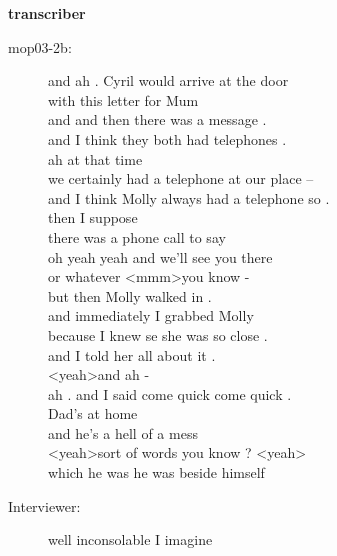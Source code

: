 \documentclass{article}
\newcommand{\turn}[2]{
\item[#1:] #2
}
\begin{document}
\begin{center}\textbf{transcriber}\end{center}

\begin{description}

\turn{mop03-2b}{and ah . Cyril would arrive at the door\\
with this letter for Mum\\
and and then there was a message .\\
and I think they both had telephones .\\
ah at that time\\
we certainly had a telephone at our place --\\
and I think Molly always had a telephone so .\\
then I suppose\\
there was a phone call to say\\
oh yeah yeah and we'll see you there\\
or whatever \textless mmm\textgreater  you know -\\
but then Molly walked in .\\
and immediately I grabbed Molly\\
because I knew se she was so close .\\
and I told her all about it .\\
\textless yeah\textgreater  and ah -\\
ah . and I said come quick come quick .\\
Dad's at home\\
and he's a hell of a mess\\
\textless yeah\textgreater  sort of words you know ? \textless yeah\textgreater \\
which he was he was beside himself}

\turn{Interviewer}{well inconsolable I imagine}


\end{description}
\end{document}
